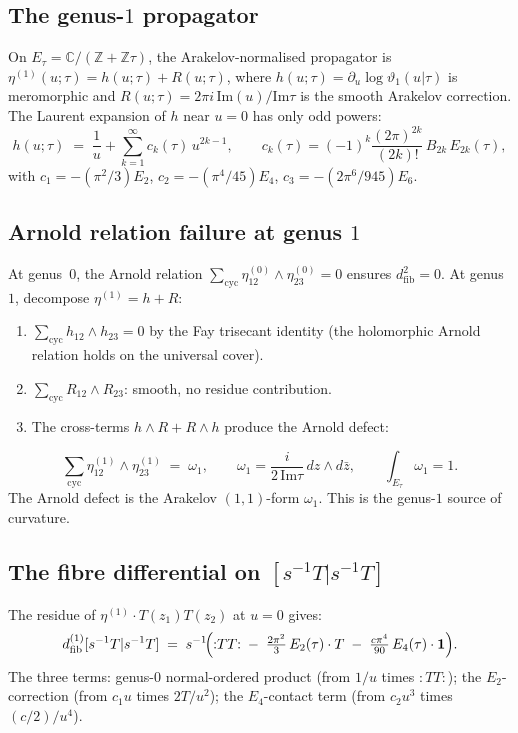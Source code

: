 \documentclass[11pt]{article}
\newcommand{\C}{\mathbb{C}}
\newcommand{\Z}{\mathbb{Z}}
\newcommand{\dfib}{d_{\mathrm{fib}}}
\begin{document}
\subsection*{The genus-$1$ propagator}

On $E_\tau = \C/(\Z + \Z\tau)$, the Arakelov-normalised
propagator is $\eta^{(1)}(u;\tau) = h(u;\tau) + R(u;\tau)$, where
$h(u;\tau) = \partial_u\log\vartheta_1(u|\tau)$ is meromorphic
and $R(u;\tau) = 2\pi i\,\mathrm{Im}(u)/\mathrm{Im}\tau$ is the
smooth Arakelov correction.  The Laurent expansion of $h$ near
$u = 0$ has only odd powers:
\[
h(u;\tau)
\;=\;
\frac{1}{u}
+ \sum_{k=1}^{\infty} c_k(\tau)\,u^{2k-1},
\qquad
c_k(\tau) = (-1)^k\frac{(2\pi)^{2k}}{(2k)!}\,B_{2k}\,E_{2k}(\tau),
\]
with $c_1 = -(\pi^2/3)E_2$, $c_2 = -(\pi^4/45)E_4$,
$c_3 = -(2\pi^6/945)E_6$.

\subsection*{Arnold relation failure at genus $1$}

At genus~$0$, the Arnold relation
$\sum_{\mathrm{cyc}}\eta^{(0)}_{12}\wedge\eta^{(0)}_{23} = 0$
ensures $\dfib^2 = 0$.  At genus~$1$, decompose $\eta^{(1)} = h + R$:
\begin{enumerate}[label=(\alph*)]
\item $\sum_{\mathrm{cyc}} h_{12}\wedge h_{23} = 0$ by the Fay
  trisecant identity (the holomorphic Arnold relation holds on the
  universal cover).
\item $\sum_{\mathrm{cyc}} R_{12}\wedge R_{23}$: smooth, no
  residue contribution.
\item The cross-terms $h\wedge R + R\wedge h$ produce the Arnold
  defect:
\end{enumerate}
\[
\sum_{\mathrm{cyc}}
\eta^{(1)}_{12}\wedge\eta^{(1)}_{23}
\;=\;
\omega_1,
\qquad
\omega_1
= \frac{i}{2\,\mathrm{Im}\tau}\,dz\wedge d\bar{z},
\qquad
\textstyle\int_{E_\tau}\omega_1 = 1.
\]
The Arnold defect is the Arakelov $(1,1)$-form
$\omega_1$.  This is the genus-$1$ source of curvature.

\subsection*{The fibre differential on $[s^{-1}T|s^{-1}T]$}

The residue of $\eta^{(1)}\cdot T(z_1)T(z_2)$ at $u = 0$ gives:
\[
\dfib^{(1)}[s^{-1}T|s^{-1}T]
\;=\;
s^{-1}\!\Bigl(
  {:}TT{:}
  \;-\; \tfrac{2\pi^2}{3}\,E_2(\tau)\cdot T
  \;-\; \tfrac{c\pi^4}{90}\,E_4(\tau)\cdot\mathbf{1}
\Bigr).
\]
The three terms: genus-$0$ normal-ordered product (from $1/u$ times
${:}TT{:}$); the $E_2$-correction (from $c_1 u$ times $2T/u^2$);
the $E_4$-contact term (from $c_2 u^3$ times $(c/2)/u^4$).
\end{document}
